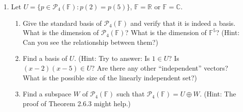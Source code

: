 \documentclass[a4paper,11pt]{article}
\begin{document}
\begin{enumerate}
   \newpage
  \item Let $U = \{p \in \mathcal{P}_4(\mathbb{F}) : p(2) = p(5)\}$, $\mathbb{F} = \mathbb{R}$ or $\mathbb{F} = \mathbb{C}$.
  \begin{enumerate}
  \item  Give the standard basis of $ \mathcal{P}_4(\mathbb{F})$ and verify that it is indeed a basis. What is the dimension of $ \mathcal{P}_4(\mathbb{F})$? What is the dimension of $\mathbb{F}^5$? (Hint: Can you see the relationship between them?)
  \item Find a basis of $U$. (Hint: Try to answer: Is $1\in U$? Is $(x-2)(x-5)\in U$? Are there any other ``independent'' vectors? What is the possible size of the linearly independent set?)
  \item Find a subspace $W$ of $\mathcal{P}_4(\mathbb{F})$ such that $\mathcal{P}_4(\mathbb{F}) = U \oplus W$. (Hint: The proof of Theorem 2.6.3 might help.)
\end{enumerate}
\end{enumerate}
\end{document}
